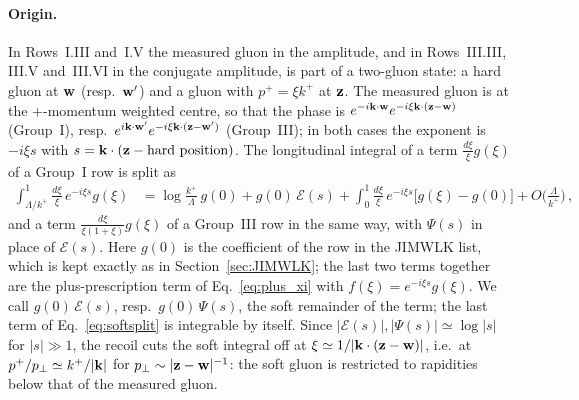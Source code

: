 \paragraph{Origin.} In Rows~I.III and~I.V the measured gluon in the amplitude, and in Rows~III.III, III.V and~III.VI in the conjugate amplitude, is part of a two-gluon state: a hard gluon at $\mathbf{w}$ (resp.\ $\mathbf{w}'$) and a gluon with $p^+=\xi k^+$ at $\mathbf{z}$. The measured gluon is at the $+$-momentum weighted centre, so that the phase is $e^{-i\mathbf{k}\cdot\mathbf{w}}e^{-i\xi\mathbf{k}\cdot(\mathbf{z}-\mathbf{w})}$ (Group~I), resp.\ $e^{i\mathbf{k}\cdot\mathbf{w}'}e^{-i\xi\mathbf{k}\cdot(\mathbf{z}-\mathbf{w}')}$ (Group~III); in both cases the exponent is $-i\xi s$ with $s=\mathbf{k}\cdot(\mathbf{z}-\text{hard position})$. The longitudinal integral of a term $\frac{d\xi}{\xi}g(\xi)$ of a Group~I row is split as
\begin{align}\label{eq:softsplit}
\int_{\Lambda/k^+}^{1}\frac{d\xi}{\xi}\,e^{-i\xi s}g(\xi)&=\log\frac{k^+}{\Lambda}\,g(0)+g(0)\,\mathcal E(s)+\int_0^{1}\frac{d\xi}{\xi}\,e^{-i\xi s}\big[g(\xi)-g(0)\big]+O\Big(\frac{\Lambda}{k^+}\Big)\,,
\end{align}
and a term $\frac{d\xi}{\xi(1+\xi)}g(\xi)$ of a Group~III row in the same way, with $\Psi(s)$ in place of $\mathcal E(s)$. Here $g(0)$ is the coefficient of the row in the JIMWLK list, which is kept exactly as in Section~\ref{sec:JIMWLK}; the last two terms together are the plus-prescription term of Eq.~\eqref{eq:plus_xi} with $f(\xi)=e^{-i\xi s}g(\xi)$. We call $g(0)\,\mathcal E(s)$, resp.\ $g(0)\,\Psi(s)$, the soft remainder of the term; the last term of Eq.~\eqref{eq:softsplit} is integrable by itself. Since $|\mathcal E(s)|,|\Psi(s)|\simeq\log|s|$ for $|s|\gg1$, the recoil cuts the soft integral off at $\xi\simeq1/|\mathbf{k}\cdot(\mathbf{z}-\mathbf{w})|$, i.e.\ at $p^+/p_\perp\simeq k^+/|\mathbf{k}|$ for $p_\perp\sim|\mathbf{z}-\mathbf{w}|^{-1}$: the soft gluon is restricted to rapidities below that of the measured gluon.


